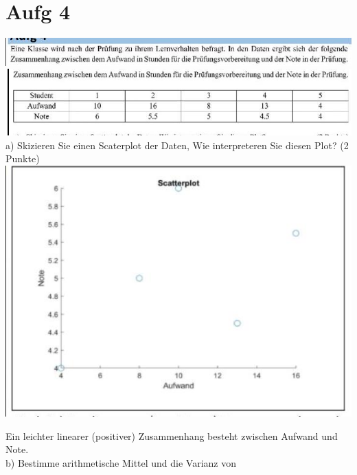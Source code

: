 \documentclass[10pt]{article}
\begin{document}
{\section*{Aufg 4}
\includegraphics[max width=\textwidth, center]{2024_12_29_0906b02acf849bda8665g-5(12)}\\
\includegraphics[max width=\textwidth, center]{2024_12_29_0906b02acf849bda8665g-5(14)}\\
a) Skizieren Sie einen Scaterplot der Daten, Wie interpreteren Sie diesen Plot? (2 Punkte)\\
\includegraphics[max width=\textwidth, center]{2024_12_29_0906b02acf849bda8665g-5(11)}

Ein leichter linearer (positiver) Zusammenhang besteht zwischen Aufwand und Note.\\
b) Bestimme arithmetische Mittel und die Varianz von

}
\end{document}
